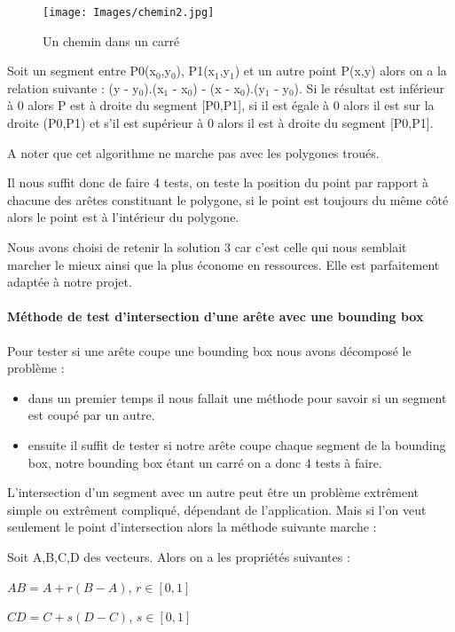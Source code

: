\documentclass[a4paper,12pt]{report}
\begin{document}
\begin{figure}[h]
\centering
\texttt{[image: Images/chemin2.jpg]}
\caption{Un chemin dans un carré}
\end{figure}
\vspace{0.5cm}

Soit un segment entre P0(x$_{0}$,y$_{0}$), P1(x$_{1}$,y$_{1}$) et un autre point P(x,y) alors on a la relation suivante : (y - y$_{0}$).(x$_{1}$ - x$_{0}$) - (x - x$_{0}$).(y$_{1}$ - y$_{0}$).
Si le résultat est inférieur à 0 alors P est à droite du segment [P0,P1], si il est égale à 0 alors il est sur la droite (P0,P1) et s'il est supérieur à 0 alors il est à droite du segment [P0,P1].

A noter que cet algorithme ne marche pas avec les polygones troués. 

Il nous suffit donc de faire 4 tests, on teste la position du point par rapport à chacune des arêtes constituant le polygone, si le point est toujours du même côté alors le point est à l'intérieur du polygone.

Nous avons choisi de retenir la solution 3 car c'est celle qui nous semblait marcher le mieux ainsi que la plus économe en ressources. Elle est parfaitement adaptée à notre projet.

\paragraph{Méthode de test d'intersection d'une arête avec une bounding box }

Pour tester si une arête coupe une bounding box nous avons décomposé le problème :
\begin{itemize}
 \item dans un premier temps il nous fallait une méthode pour savoir si un segment est coupé par un autre.
 \item ensuite il suffit de tester si notre arête coupe chaque segment de la bounding box, notre bounding box étant un carré on a donc 4 tests à faire.
\end{itemize}

L'intersection d'un segment avec un autre peut être un problème extrêment simple ou extrêment compliqué, dépendant de l'application. 
Mais si l'on veut seulement le point d'intersection alors la méthode suivante marche :

Soit A,B,C,D des vecteurs. Alors on a les propriétés suivantes :

$AB=A+r(B-A)$, $r \in [0,1]$

$CD=C+s(D-C)$, $s \in [0,1]$
\end{document}
